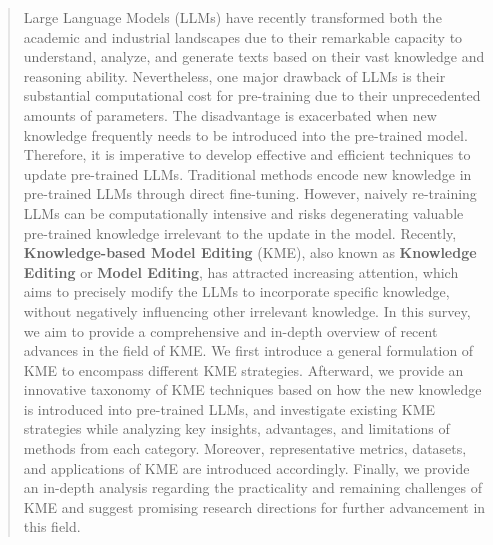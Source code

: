 \documentclass[acmsmall, screen]{acmart}
\begin{document}



\begin{abstract}
Large Language Models (LLMs) have recently transformed both the academic and industrial landscapes due to their remarkable capacity to understand, analyze, and generate texts based on their vast knowledge and reasoning ability.
Nevertheless, one major drawback of LLMs is their substantial computational cost for pre-training due to their unprecedented amounts of parameters. The disadvantage is exacerbated when new knowledge frequently needs to be introduced into the pre-trained model.
Therefore, it is imperative to develop effective and efficient techniques to update pre-trained LLMs. Traditional methods encode new knowledge in pre-trained LLMs through direct fine-tuning. However, naively re-training LLMs can be computationally intensive and risks degenerating valuable pre-trained knowledge irrelevant to the update in the model. Recently, \textbf{Knowledge-based Model Editing} (KME), also known as \textbf{Knowledge Editing} or \textbf{Model Editing}, has attracted increasing attention, which aims to precisely modify the LLMs to incorporate specific knowledge, without negatively influencing other irrelevant knowledge. In this survey, we aim to provide a comprehensive and in-depth overview of recent advances in the field of KME. We first introduce a general %
formulation of KME to encompass different KME strategies. Afterward, we provide an innovative taxonomy of KME techniques based on how the new knowledge is introduced into pre-trained LLMs, and investigate existing KME strategies while analyzing 
key insights, advantages, and limitations of methods from each category. 
Moreover, representative metrics, datasets, and applications of KME are introduced accordingly. Finally, we provide an in-depth analysis regarding the practicality and remaining challenges of KME and suggest promising research directions for further advancement in this field.


\end{abstract}
\end{document}
